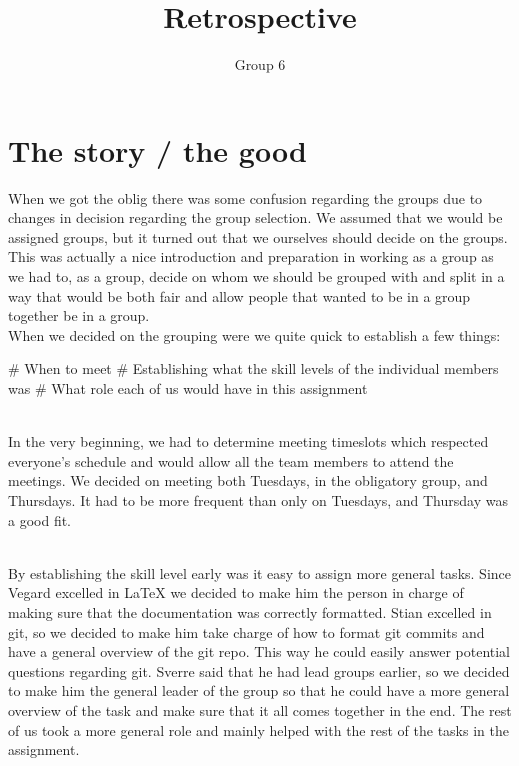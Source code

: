 \documentclass{article}
\title{Retrospective}
\author{Group 6}
\begin{document}
\maketitle

\newpage

\section*{The story / the good}

When we got the oblig there was some confusion regarding the groups due to changes in decision regarding the group selection. We assumed that we would be assigned groups, but it turned out that we ourselves should decide on the groups. This was actually a nice introduction and preparation in working as a group as we had to, as a group, decide on whom we should be grouped with and split in a way that would be both fair and allow people that wanted to be in a group together be in a group. \\

\noindent
When we decided on the grouping were we quite quick to establish a few things:
\\
\begin{easylist}[itemize]

# When to meet
# Establishing what the skill levels of the individual members was
# What role each of us would have in this assignment

\end{easylist}

\noindent \\
In the very beginning, we had to determine meeting timeslots which respected everyone's schedule and would allow all the team members to attend the meetings. We decided on meeting both Tuesdays, in the obligatory group, and Thursdays. It had to be more frequent than only on Tuesdays, and Thursday was a good fit.

\noindent \\
By establishing the skill level early was it easy to assign more general tasks. Since Vegard excelled in LaTeX we decided to make him the person in charge of making sure that the documentation was correctly formatted. Stian excelled in git, so we decided to make him take charge of how to format git commits and have a general overview of the git repo. This way he could easily answer potential questions regarding git. Sverre said that he had lead groups earlier, so we decided to make him the general leader of the group so that he could have a more general overview of the task and make sure that it all comes together in the end. The rest of us took a more general role and mainly helped with the rest of the tasks in the assignment.
\end{document}
